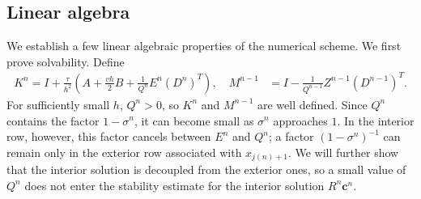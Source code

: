 \documentclass[11pt,reqno]{amsart}
\theoremstyle{plain}
\theoremstyle{definition}
\numberwithin{equation}{section}
\newcommand{\paren}[1]{\left(#1\right)}
\newcommand{\bm}[1]{\boldsymbol{#1}}
\begin{document}
\subsection{Linear algebra}
We establish a few linear algebraic properties of the numerical scheme. 
We first prove solvability.
Define
\begin{align}
    K^n = I + \frac{\tau}{h^2}\paren{A + \frac{vh}{2} B + \frac{1}{Q^n} E^n (D^{n})^T}, \quad M^{n-1} &=  I - \frac{1}{Q^{n-1}}Z^{n-1}(D^{n-1})^T.
\end{align}
For sufficiently small $h$, $Q^n>0$, so $K^n$ and $M^{n-1}$ are well defined. Since $Q^n$ contains the factor $1-\sigma^n$, it can become small as $\sigma^n$ approaches $1$. In the interior row, however, this factor cancels between $E^n$ and $Q^n$; a factor $(1-\sigma^n)^{-1}$ can remain only in the exterior row associated with $x_{j(n)+1}$. We will further show that the interior solution is decoupled from the exterior ones, so a small value of $Q^n$ does not enter the stability estimate for the interior solution $R^n\bm c^n$.
\end{document}
